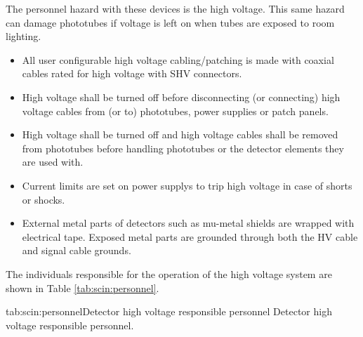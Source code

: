 \begin{safetyen}{0}{0}

The personnel hazard with these devices is the high voltage.
This same hazard can
damage phototubes if voltage is left on when tubes are exposed to room
lighting.

\begin{itemize}
  \item All user configurable high voltage cabling/patching is made with
  coaxial cables rated for high voltage with SHV connectors.
  \item High voltage shall be turned off before disconnecting (or connecting)
  high voltage cables from (or to) phototubes, power supplies or patch panels.
  \item High voltage shall be turned off and high voltage cables shall
  be removed from phototubes before handling phototubes or the detector
  elements they are used with.
  \item Current limits are set on power supplys to trip high voltage in case
  of shorts or shocks.
  \item External metal parts of detectors such as mu-metal shields are wrapped
  with electrical tape.  Exposed metal parts are grounded through both the HV
  cable and signal cable grounds.
\end{itemize}


The individuals responsible for the operation
of the high voltage system are shown in Table \ref{tab:scin:personnel}.

\begin{namestab}{tab:scin:personnel}{Detector high voltage responsible personnel} {%
      Detector high voltage responsible personnel.}
  \StephenWood{}
  \MahlonLong{}
  \JoeBeaufait{}
  \JackSegal{}
\end{namestab}
\end{safetyen}

